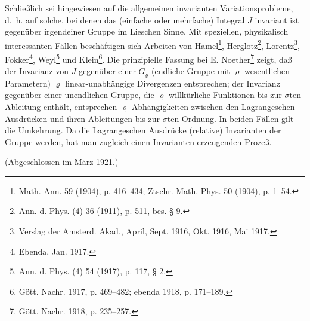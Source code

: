 Schließlich sei hingewiesen auf die allgemeinen \glqq{}invarianten Variationsprobleme\grqq{}, d.~h. auf solche, bei denen das (einfache oder mehrfache) Integral $J$ invariant ist gegenüber irgendeiner Gruppe im Lieschen Sinne. Mit speziellen, physikalisch interessanten Fällen beschäftigen sich Arbeiten von Hamel\footnote{Math. Ann. 59 (1904), p. 416--434; Ztschr. Math. Phys. 50 (1904), p. 1--54.}, Herglotz\footnote{Ann. d. Phys. (4) 36 (1911), p. 511, bes. § 9.}, Lorentz\footnote{Verslag der Amsterd. Akad., April, Sept. 1916, Okt. 1916, Mai 1917.}, Fokker\footnote{Ebenda, Jan. 1917.}, Weyl\footnote{Ann. d. Phys. (4) 54 (1917), p. 117, § 2.} und Klein\footnote{Gött. Nachr. 1917, p. 469--482; ebenda 1918, p. 171--189.}. Die prinzipielle Fassung bei E. Noether\footnote{Gött. Nachr. 1918, p. 235--257.} zeigt, daß der Invarianz von $J$ gegenüber einer $G_\varrho$ (endliche Gruppe mit $\varrho$ wesentlichen Parametern) $\varrho$ linear-unabhängige Divergenzen entsprechen; der Invarianz gegenüber einer unendlichen Gruppe, die $\varrho$ willkürliche Funktionen bis zur $\sigma$ten Ableitung enthält, entsprechen $\varrho$ Abhängigkeiten zwischen den Lagrangeschen Ausdrücken und ihren Ableitungen bis zur $\sigma$ten Ordnung. In beiden Fällen gilt die Umkehrung. Da die Lagrangeschen Ausdrücke (relative) Invarianten der Gruppe werden, hat man zugleich einen Invarianten erzeugenden Prozeß.

\begin{center}
(Abgeschlossen im März 1921.)
\end{center}
\endgroup

\clearpage
\setcounter{footnote}{0}
